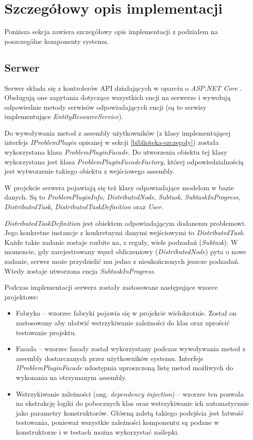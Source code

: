 \documentclass[a4paper,11pt,twoside]{report}
\theoremstyle{definition}
\begin{document}
\section{Szczegółowy opis implementacji}

Poniższa sekcja zawiera szczegółowy opis implementacji z podziałem na poszczególne komponenty systemu.


\subsection{Serwer}

Serwer składa się z kontrolerów API działających w oparciu o \textit{ASP.NET Core} \cite{aspnet-core}. Obsługują one zapytania dotyczące wszystkich encji na serwerze i wywołują odpowiednie metody serwisów odpowiadających encji (są to serwisy implementujące \textit{EntityResourceService}).

Do wywoływania metod z assembly użytkowników (z klasy implementującej interfejs \textit{IProblemPlugin} opisanej w sekcji \ref{biblioteka-szczegoly}) została wykorzystana klasa \textit{ProblemPluginFacade}. Do utworzenia obiektu tej klasy wykorzystana jest klasa \textit{ProblemPluginFacadeFactory}, której odpowiedzialnością jest wytworzenie takiego obiektu z wejściowego assembly.

W projekcie serwera pojawiają się też klasy odpowiadające modelom w bazie danych. Są to \textit{ProblemPluginInfo}, \textit{DistributedNode}, \textit{Subtask}, \textit{SubtaskInProgress}, \textit{DistributedTask}, \textit{DistributedTaskDefinition} oraz \textit{User}.

\textit{DistributedTaskDefinition} jest obiektem odpowiadającym dodanemu problemowi. Jego konkretne instancje z konkretnymi danymi wejściowymi to \textit{DistributedTask}. Każde takie zadanie zostaje rozbite na, z reguły, wiele podzadań (\textit{Subtask}). W momencie, gdy zarejestrowany węzeł obliczeniowy (\textit{DistributedNode}) pyta o nowe zadanie, serwer może przydzielić mu jedno z nieukończonych jeszcze podzadań. Wtedy zostaje utworzona encja \textit{SubtaskInProgress}.



Podczas implementacji serwera zostały zastosowane następujące wzorce projektowe:
\begin{itemize}
	\item Fabryka -- wzorzec fabryki pojawia się w projekcie wielokrotnie. Został on zastosowany aby ułatwić wstrzykiwanie zależności do klas oraz uprościć testowanie projektu.
	\item Fasada -- wzorzec fasady został wykorzystany podczas wywoływania metod z assembly dostarczanych przez użytkowników systemu. Interfejs \textit{IProblemPluginFacade} udostępnia  uproszczoną listę metod możliwych do wykonania na otrzymanym assembly.
	\item Wstrzykiwanie zależności (ang. \textit{dependency injection}) -- wzorzec ten pozwala na ekstrakcję logiki do pobocznych klas oraz wstrzykiwanie ich automatycznie jako parametry konstruktorów. Główną zaletą takiego podejścia jest łatwość testowania, ponieważ wszystkie zależności komponentu są podane w konstruktorze i w testach można wykorzystać zaślepki.
\end{itemize}
\end{document}
